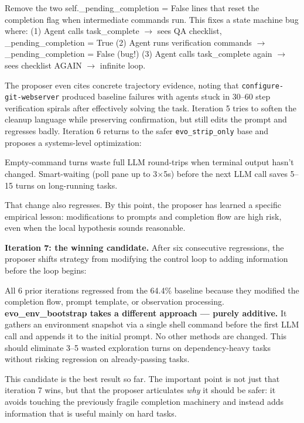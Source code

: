 \begin{logbox}
Remove the two self.\_pending\_completion = False lines that reset the completion flag when intermediate commands run. This fixes a state machine bug where: (1) Agent calls task\_complete $\rightarrow$ sees QA checklist, \_pending\_completion = True (2) Agent runs verification commands $\rightarrow$ \_pending\_completion = False (bug!) (3) Agent calls task\_complete again $\rightarrow$ sees checklist AGAIN $\rightarrow$ infinite loop.
\end{logbox}

The proposer even cites concrete trajectory evidence, noting that \texttt{configure-git-webserver} produced baseline failures with agents stuck in 30--60 step verification spirals after effectively solving the task.
Iteration 5 tries to soften the cleanup language while preserving confirmation, but still edits the prompt and regresses badly.
Iteration 6 returns to the safer \texttt{evo\_strip\_only} base and proposes a systems-level optimization:

\begin{logbox}
Empty-command turns waste full LLM round-trips when terminal output hasn't changed. Smart-waiting (poll pane up to 3$\times$5s) before the next LLM call saves 5--15 turns on long-running tasks.
\end{logbox}

That change also regresses.
By this point, the proposer has learned a specific empirical lesson: modifications to prompts and completion flow are high risk, even when the local hypothesis sounds reasonable.

\textbf{Iteration 7: the winning candidate.}
After six consecutive regressions, the proposer shifts strategy from modifying the control loop to adding information before the loop begins:

\begin{logbox}
All 6 prior iterations regressed from the 64.4\% baseline because they modified the completion flow, prompt template, or observation processing. \textbf{evo\_env\_bootstrap takes a different approach --- purely additive.} It gathers an environment snapshot via a single shell command before the first LLM call and appends it to the initial prompt. No other methods are changed. This should eliminate 3--5 wasted exploration turns on dependency-heavy tasks without risking regression on already-passing tasks.
\end{logbox}

This candidate is the best result so far.
The important point is not just that iteration 7 wins, but that the proposer articulates \emph{why} it should be safer: it avoids touching the previously fragile completion machinery and instead adds information that is useful mainly on hard tasks.

